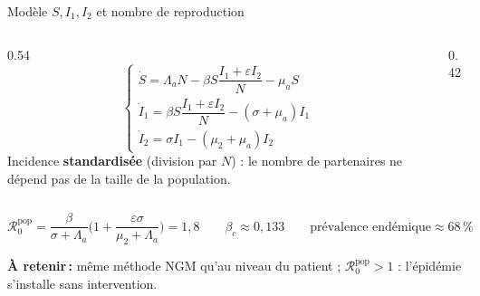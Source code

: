 \documentclass[aspectratio=169,11pt,t]{beamer}
\newcommand{\Rzero}{\mathcal{R}_0}
\newcommand{\takeaway}[1]{\vfill\noindent{\color{gold}\vrule width 3pt}\colorbox{lightbg}{\parbox[c]{\dimexpr\textwidth-3pt-2\fboxsep\relax}{\vphantom{Ég}\small\textbf{\color{navy}À retenir\,:} #1\vphantom{Ég}}}\par}
\begin{document}
\begin{frame}{Modèle $S, I_1, I_2$ et nombre de reproduction}
    \begin{columns}[T,onlytextwidth]
        \begin{column}{0.54\textwidth}
            \footnotesize
            \[
            \begin{cases}
            \dot S=\Lambda_aN-\beta S\dfrac{I_1+\varepsilon I_2}{N}-\mu_aS\\[4pt]
            \dot I_1=\beta S\dfrac{I_1+\varepsilon I_2}{N}-(\sigma+\mu_a)I_1\\[4pt]
            \dot I_2=\sigma I_1-(\mu_2+\mu_a)I_2
            \end{cases}
            \]
            \small Incidence \textbf{standardisée} (division par $N$) : le nombre de partenaires ne dépend pas de la taille de la population.
        \end{column}
        \begin{column}{0.42\textwidth}
            \centering
        \end{column}
    \end{columns}
    \vspace{0.2cm}
    \[
    \Rzero^{\mathrm{pop}}=\frac{\beta}{\sigma+\Lambda_a}\Big(1+\frac{\varepsilon\sigma}{\mu_2+\Lambda_a}\Big)=1{,}8
    \qquad\beta_c\approx0{,}133\qquad\text{prévalence endémique}\approx68\,\%
    \]
    \takeaway{même méthode NGM qu'au niveau du patient ; $\Rzero^{\mathrm{pop}}>1$ : l'épidémie s'installe sans intervention.}
\end{frame}
\end{document}
